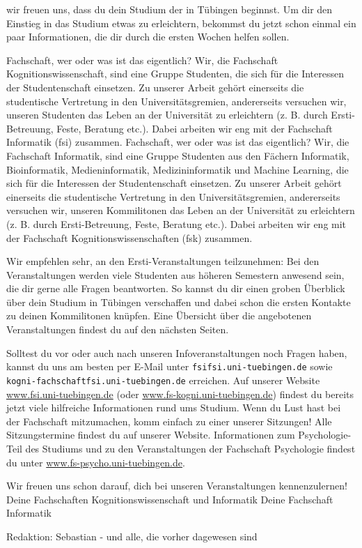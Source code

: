 \thispagestyle{firststyle}
wir freuen uns, dass du dein Studium der \studiengang in Tübingen beginnst.
Um dir den Einstieg in das Studium etwas zu erleichtern, bekommst du jetzt schon einmal
ein paar Informationen, die dir durch die ersten Wochen helfen sollen.

\ifkogwiss
\glqq Fachschaft\grqq, wer oder was ist das eigentlich? Wir, die Fachschaft Kognitionswissenschaft,
sind eine Gruppe Studenten, die sich für die Interessen der Studentenschaft einsetzen. Zu unserer Arbeit
gehört einerseits die studentische Vertretung in den Universitätsgremien, andererseits versuchen wir, unseren
Studenten das Leben an der Universität zu erleichtern (z. B. durch Ersti-Betreuung, Feste, Beratung etc.).
Dabei arbeiten wir eng mit der Fachschaft Informatik (fsi) zusammen.
\else
\glqq Fachschaft\grqq, wer oder was ist das eigentlich? Wir, die Fachschaft Informatik, sind eine Gruppe Studenten aus den Fächern
Informatik, Bioinformatik, Medieninformatik, Medizininformatik und Machine Learning, die sich für die Interessen der Studentenschaft einsetzen. Zu unserer Arbeit
gehört einerseits die studentische Vertretung in den Universitätsgremien, andererseits versuchen wir, unseren
Kommilitonen das Leben an der Universität zu erleichtern (z. B. durch Ersti-Betreuung, Feste, Beratung etc.).
Dabei arbeiten wir eng mit der Fachschaft Kognitionswissenschaften (fsk) zusammen.
\fi

Wir empfehlen sehr, an den Ersti-Veranstaltungen teilzunehmen:
Bei den Veranstaltungen werden viele Studenten aus höheren Semestern anwesend sein, die dir gerne alle Fragen beantworten.
So kannst du dir einen groben Überblick über dein Studium in Tübingen verschaffen und dabei schon die ersten Kontakte zu deinen Kommilitonen knüpfen.
Eine Übersicht über die angebotenen Veranstaltungen findest du auf den nächsten Seiten.

Solltest du vor oder auch nach unseren Infoveranstaltungen noch Fragen haben, kannst du uns
am besten per E-Mail unter \texttt{fsi\At fsi.uni-tuebingen.de}
\ifkogwiss
sowie \texttt{kogni-fachschaft\At fsi.uni-tuebingen.de}
\fi
erreichen.
Auf unserer Website \url{www.fsi.uni-tuebingen.de} \ifkogwiss (oder \url{www.fs-kogni.uni-tuebingen.de}) \fi findest du bereits
jetzt viele hilfreiche Informationen rund ums Studium. Wenn du Lust hast bei der Fachschaft mitzumachen,
komm einfach zu einer unserer Sitzungen! Alle Sitzungstermine findest du auf unserer Website.
\ifkogwiss Informationen zum Psychologie-Teil des Studiums und zu den Veranstaltungen der
Fachschaft Psychologie findest du unter \url{www.fs-psycho.uni-tuebingen.de}.\fi

\enlargethispage{3\baselineskip} %
Wir freuen uns schon darauf, dich bei unseren Veranstaltungen kennenzulernen!\\
\ifkogwiss
Deine Fachschaften Kognitionswissenschaft und Informatik
\else
Deine Fachschaft Informatik
\par\hfill
{\footnotesize Redaktion: Sebastian - und alle, die vorher dagewesen sind}
\fi
\vfill
